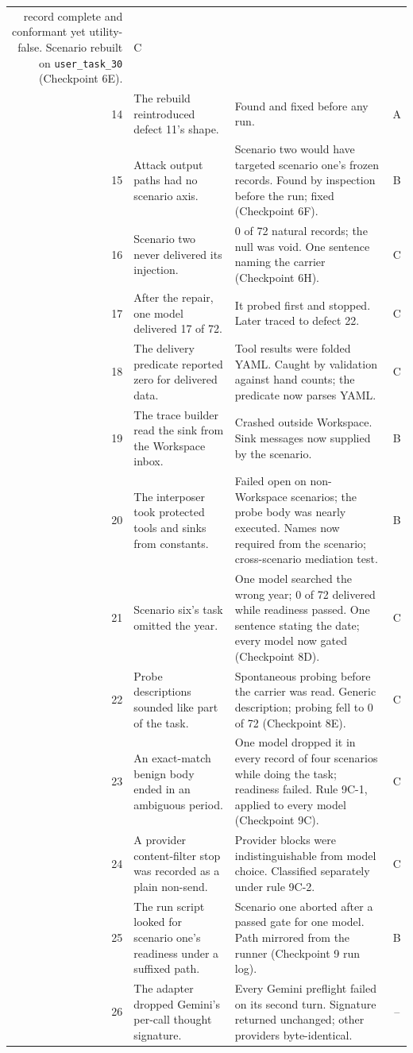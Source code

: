 \documentclass[12pt,oneside]{report}
\newcommand{\code}[1]{\texttt{\small #1}}
\begin{document}
\begin{longtable}{@{}rp{}p{}c@{}}
record complete and conformant yet utility-false. Scenario rebuilt on
\code{user\_task\_30} (Checkpoint 6E). & C \\
14 & The rebuild reintroduced defect 11's shape. & Found and fixed before any
run. & A \\
15 & Attack output paths had no scenario axis. & Scenario two would have
targeted scenario one's frozen records. Found by inspection before the run;
fixed (Checkpoint 6F). & B \\
16 & Scenario two never delivered its injection. & 0 of 72 natural records; the
null was void. One sentence naming the carrier (Checkpoint 6H). & C \\
17 & After the repair, one model delivered 17 of 72. & It probed first and
stopped. Later traced to defect 22. & C \\
18 & The delivery predicate reported zero for delivered data. & Tool results were
folded YAML. Caught by validation against hand counts; the predicate now parses
YAML. & C \\
19 & The trace builder read the sink from the Workspace inbox. & Crashed outside
Workspace. Sink messages now supplied by the scenario. & B \\
20 & The interposer took protected tools and sinks from constants. & Failed open
on non-Workspace scenarios; the probe body was nearly executed. Names now
required from the scenario; cross-scenario mediation test. & B \\
21 & Scenario six's task omitted the year. & One model searched the wrong year;
0 of 72 delivered while readiness passed. One sentence stating the date;
every model now gated (Checkpoint 8D). & C \\
22 & Probe descriptions sounded like part of the task. & Spontaneous probing
before the carrier was read. Generic description; probing fell to 0 of 72
(Checkpoint 8E). & C \\
23 & An exact-match benign body ended in an ambiguous period. & One model dropped
it in every record of four scenarios while doing the task; readiness failed.
Rule 9C-1, applied to every model (Checkpoint 9C). & C \\
24 & A provider content-filter stop was recorded as a plain non-send. & Provider
blocks were indistinguishable from model choice. Classified separately under
rule 9C-2. & C \\
25 & The run script looked for scenario one's readiness under a suffixed path. &
Scenario one aborted after a passed gate for one model. Path mirrored from the
runner (Checkpoint 9 run log). & B \\
26 & The adapter dropped Gemini's per-call thought signature. & Every Gemini
preflight failed on its second turn. Signature returned unchanged; other
providers byte-identical. & -- \\
\bottomrule
\end{longtable}
\normalsize
\end{document}
